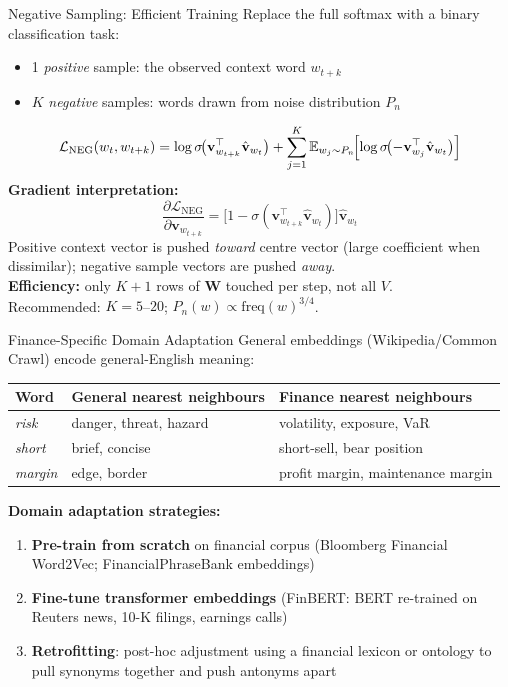 \documentclass[9pt,t]{beamer}
\begin{document}
\begin{frame}{Negative Sampling: Efficient Training}
  Replace the full softmax with a binary classification task:
  \begin{itemize}
    \item 1 \emph{positive} sample: the observed context word $w_{t+k}$
    \item $K$ \emph{negative} samples: words drawn from noise distribution $P_n$
  \end{itemize}
  \[
    \mathcal{L}_{\mathrm{NEG}}(w_t, w_{t+k})
    = \log \sigma\!\bigl(\mathbf{v}_{w_{t+k}}^{\top} \hat{\mathbf{v}}_{w_t}\bigr)
    + \sum_{j=1}^{K}
      \mathbb{E}_{w_j \sim P_n}\!
      \Bigl[\log \sigma\!\bigl(-\mathbf{v}_{w_j}^{\top} \hat{\mathbf{v}}_{w_t}\bigr)\Bigr]
  \]
  \textbf{Gradient interpretation:}
  \[
    \frac{\partial \mathcal{L}_{\mathrm{NEG}}}{\partial \mathbf{v}_{w_{t+k}}}
    = \bigl[1 - \sigma(\mathbf{v}_{w_{t+k}}^{\top} \hat{\mathbf{v}}_{w_t})\bigr]\hat{\mathbf{v}}_{w_t}
  \]
  Positive context vector is pushed \emph{toward} centre vector (large coefficient when dissimilar);
  negative sample vectors are pushed \emph{away}.\\[4pt]
  \textbf{Efficiency:} only $K{+}1$ rows of $\mathbf{W}$ touched per step, not all $V$.\\
  Recommended: $K = 5$--$20$; $P_n(w) \propto \mathrm{freq}(w)^{3/4}$.
\end{frame}

\begin{frame}{Finance-Specific Domain Adaptation}
  General embeddings (Wikipedia/Common Crawl) encode general-English meaning:
  \medskip
  \begin{center}
  \begin{tabular}{@{}lll@{}}
    \toprule
    Word & General nearest neighbours & Finance nearest neighbours \\
    \midrule
    \textit{risk}   & danger, threat, hazard   & volatility, exposure, VaR \\
    \textit{short}  & brief, concise           & short-sell, bear position \\
    \textit{margin} & edge, border             & profit margin, maintenance margin \\
    \bottomrule
  \end{tabular}
  \end{center}
  \medskip
  \textbf{Domain adaptation strategies:}
  \begin{enumerate}
    \item \textbf{Pre-train from scratch} on financial corpus
          (Bloomberg Financial Word2Vec; FinancialPhraseBank embeddings)
    \item \textbf{Fine-tune transformer embeddings}
          (FinBERT: BERT re-trained on Reuters news, 10-K filings, earnings calls)
    \item \textbf{Retrofitting}: post-hoc adjustment using a financial lexicon or ontology
          to pull synonyms together and push antonyms apart
  \end{enumerate}
\end{frame}
\end{document}
